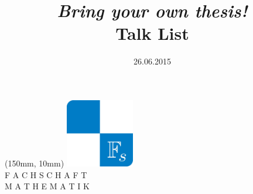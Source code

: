 \documentclass[12pt, a4paper, english]{article}
\title{\emph{Bring your own thesis!} \\ Talk List}
\date{26.06.2015}
\begin{document}
\maketitle

\begin{textblock*}{50mm}(150mm, 10mm)
\includegraphics[width=30mm]{fs}\\
        \small
        F A C H S C H A F T\\
        M A T H E M A T I K
\end{textblock*}


\end{document}
